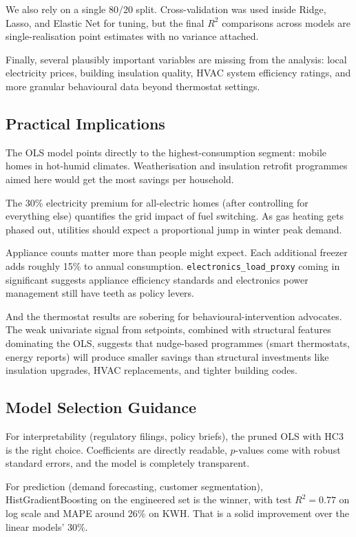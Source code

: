 \documentclass[10pt,twocolumn]{article}
\begin{document}
We also rely on a single 80/20 split. Cross-validation was used inside Ridge, Lasso, and Elastic Net for tuning, but the final $R^2$ comparisons across models are single-realisation point estimates with no variance attached.

Finally, several plausibly important variables are missing from the analysis: local electricity prices, building insulation quality, HVAC system efficiency ratings, and more granular behavioural data beyond thermostat settings.

\subsection{Practical Implications}

The OLS model points directly to the highest-consumption segment: mobile homes in hot-humid climates. Weatherisation and insulation retrofit programmes aimed here would get the most savings per household.

The 30\% electricity premium for all-electric homes (after controlling for everything else) quantifies the grid impact of fuel switching. As gas heating gets phased out, utilities should expect a proportional jump in winter peak demand.

Appliance counts matter more than people might expect. Each additional freezer adds roughly 15\% to annual consumption. \texttt{electronics\_load\_proxy} coming in significant suggests appliance efficiency standards and electronics power management still have teeth as policy levers.

And the thermostat results are sobering for behavioural-intervention advocates. The weak univariate signal from setpoints, combined with structural features dominating the OLS, suggests that nudge-based programmes (smart thermostats, energy reports) will produce smaller savings than structural investments like insulation upgrades, HVAC replacements, and tighter building codes.

\subsection{Model Selection Guidance}

For interpretability (regulatory filings, policy briefs), the pruned OLS with HC3 is the right choice. Coefficients are directly readable, $p$-values come with robust standard errors, and the model is completely transparent.

For prediction (demand forecasting, customer segmentation), HistGradientBoosting on the engineered set is the winner, with test $R^2 = 0.77$ on log scale and MAPE around 26\% on KWH. That is a solid improvement over the linear models' 30\%.
\end{document}
